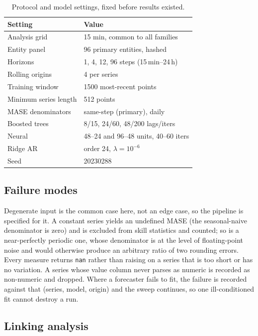 \documentclass[11pt,a4paper]{article}
\newcommand{\num}[1]{#1}
\begin{document}
\begin{table}[t]
\centering
\caption{Protocol and model settings, fixed before results existed.}
\label{tab:hyper}
\small
\begin{tabular}{ll}
\toprule
Setting & Value \\
\midrule
Analysis grid & \num{15} min, common to all families \\
Entity panel & \num{96} primary entities, hashed \\
Horizons & 1, 4, 12, 96 steps (15\,min--24\,h) \\
Rolling origins & 4 per series \\
Training window & \num{1500} most-recent points \\
Minimum series length & \num{512} points \\
MASE denominators & same-step (primary), daily \\
Boosted trees & 8/15, 24/60, 48/200 lags/iters \\
Neural & 48--24 and 96--48 units, 40--60 iters \\
Ridge AR & order 24, \(\lambda=10^{-6}\) \\
Seed & \num{20230288} \\
\bottomrule
\end{tabular}
\end{table}

\subsection{Failure modes}
\label{sec:failures}

Degenerate input is the common case here, not an edge case, so the pipeline is
specified for it. A constant series yields an undefined MASE (the seasonal-naive
denominator is zero) and is excluded from skill statistics and counted; so is a
near-perfectly periodic one, whose denominator is at the level of floating-point
noise and would otherwise produce an arbitrary ratio of two rounding errors. Every
measure returns \texttt{nan} rather than raising on a series that is too short or
has no variation. A series whose value column never parses as numeric is recorded
as non-numeric and dropped. Where a forecaster fails to fit, the failure is
recorded against that (series, model, origin) and the sweep continues, so one
ill-conditioned fit cannot destroy a run.

\subsection{Linking analysis}
\end{document}
